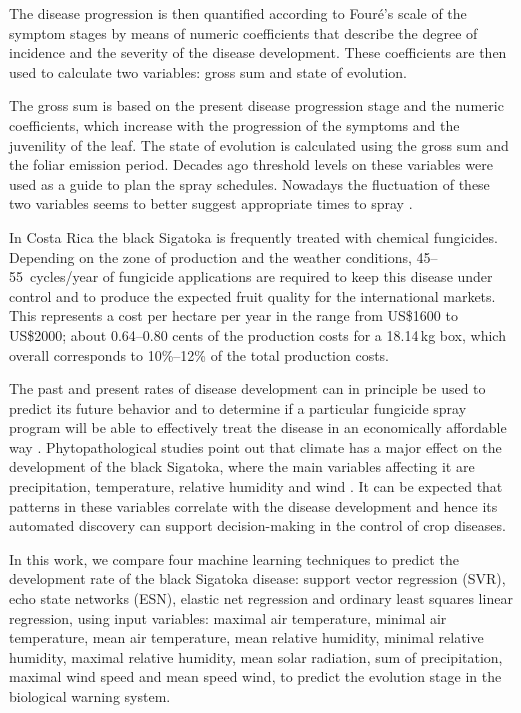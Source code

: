 The disease progression is then quantified according to Fouré's scale
of the symptom stages \citep{foure1988} by means of numeric
coefficients that describe the degree of incidence and the severity of
the disease development.  These coefficients are then used to
calculate two variables: gross sum and state of evolution.

The gross sum is based on the present disease progression stage and
the numeric coefficients, which increase with the progression of
the symptoms and the juvenility of the leaf.
%
The state of evolution is calculated using the gross sum and the
foliar emission period.
%
Decades ago threshold levels on these variables were used as a guide
to plan the spray schedules.  Nowadays the fluctuation of these two
variables seems to better suggest appropriate times to spray
\citep{Marinetal2003}.

In Costa Rica the black Sigatoka is frequently treated with
chemical fungicides.
%
Depending on the zone of production and the weather conditions,
45--55~cycles/year of fungicide applications are required to keep this
disease under control and to produce the expected fruit quality for the
international markets.
%
This represents a cost per hectare per year in the range from US\$1600
to US\$2000; about 0.64--0.80 cents of the production costs for a
18.14\,kg box, which overall corresponds to 10\%--12\% of the total
production costs.

The past and present rates of disease development can in principle be
used to predict its future behavior and to determine if a particular
fungicide spray program will be able to effectively treat the disease
in an economically affordable way \citep{ChuangJeger1987}.
%
Phytopathological studies point out that climate has a major effect on
the development of the black Sigatoka, where the main variables
affecting it are precipitation, temperature, relative humidity and
wind \citep{MarinVargas1995}.  It can be expected that patterns in
these variables correlate with the disease development and hence its
automated discovery can support decision-making in the control of crop
diseases.

In this work, we compare four machine learning techniques to predict
the development rate of the black Sigatoka disease: support vector
regression (SVR), echo state networks (ESN), elastic net regression 
and ordinary least squares linear regression,
using input variables: maximal air temperature, minimal air temperature,
 mean air temperature, mean relative humidity, minimal relative humidity, 
 maximal relative humidity, mean solar radiation, sum of precipitation, 
 maximal wind speed and mean speed wind, to predict the evolution stage 
 in the biological warning system. 

